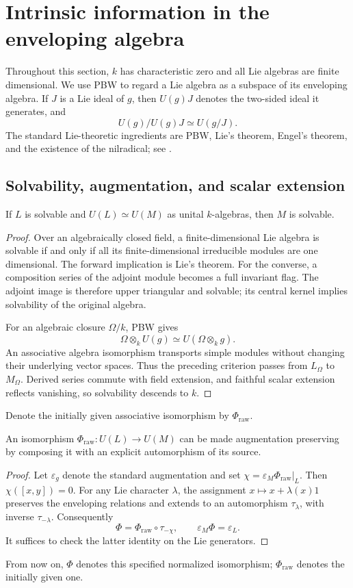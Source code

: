 \section{Intrinsic information in the enveloping algebra}\label{sec:intrinsic}
Throughout this section, $k$ has characteristic zero and all Lie algebras
are finite dimensional. We use PBW to regard a Lie algebra as a subspace
of its enveloping algebra. If $J$ is a Lie ideal of $g$, then
$U(g)J$ denotes the two-sided ideal it generates, and
\[
 U(g)/U(g)J\simeq U(g/J).
\]
The standard Lie-theoretic ingredients are PBW, Lie's theorem, Engel's
theorem, and the existence of the nilradical; see
\cite{Humphreys1972,BourbakiLie1989}.

\subsection{Solvability, augmentation, and scalar extension}

\begin{lemma}\label{lem:target-solvable}
If $L$ is solvable and
$U(L)\simeq U(M)$ as unital $k$-algebras, then
$M$ is solvable.
\end{lemma}
\begin{proof}
Over an algebraically closed field, a finite-dimensional Lie algebra is
solvable if and only if all its finite-dimensional irreducible modules
are one dimensional. The forward implication is Lie's theorem. For the
converse, a composition series of the adjoint module becomes a full
invariant flag. The adjoint image is therefore upper triangular and
solvable; its central kernel implies solvability of the original algebra.

For an algebraic closure $\Omega/k$, PBW gives
\[
 \Omega\otimes_k U(g)\simeq U(\Omega\otimes_kg).
\]
An associative algebra isomorphism transports simple modules without
changing their underlying vector spaces. Thus the preceding criterion
passes from $L_\Omega$ to $M_\Omega$. Derived series
commute with field extension, and faithful scalar extension reflects
vanishing, so solvability descends to $k$.
\end{proof}

Denote the initially given associative isomorphism by $\Phi_{\mathrm{raw}}$.
\begin{lemma}\label{lem:augmentation}
An isomorphism $\Phi_{\mathrm{raw}}:U(L)\to U(M)$ can be made
augmentation preserving by composing it with an explicit automorphism
of its source.
\end{lemma}
\begin{proof}
Let $\varepsilon_{g}$ denote the standard augmentation and set
$\chi=\varepsilon_{M}\Phi_{\mathrm{raw}}|_{L}$. Then
$\chi([x,y])=0$. For any Lie character $\lambda$, the assignment
$x\mapsto x+\lambda(x)1$ preserves the enveloping relations and extends
to an automorphism $\tau_\lambda$, with inverse $\tau_{-\lambda}$.
Consequently
\[
 \Phi=\Phi_{\mathrm{raw}}\circ\tau_{-\chi},\qquad
 \varepsilon_{M}\Phi=\varepsilon_{L}.
\]
It suffices to check the latter identity on the Lie generators.
\end{proof}
From now on, $\Phi$ denotes this specified normalized isomorphism;
$\Phi_{\mathrm{raw}}$ denotes the initially given one.

